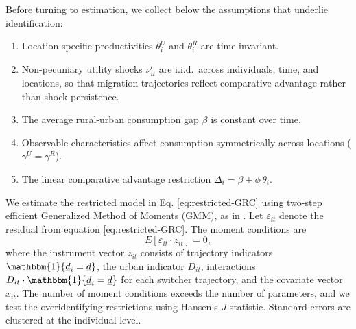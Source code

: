 \documentclass[12pt]{article}
\begin{document}
Before turning to estimation, we collect below the assumptions that underlie identification:
\begin{enumerate}[label=\textup{(A\arabic*)},leftmargin=*,itemsep=2pt]
    \item Location-specific productivities $\theta_i^U$ and $\theta_i^R$ are time-invariant.
    \item Non-pecuniary utility shocks $\nu_{it}^l$ are i.i.d.\ across individuals, time, and locations, so that migration trajectories reflect comparative advantage rather than shock persistence.
    \item The average rural-urban consumption gap $\beta$ is constant over time.
    \item Observable characteristics affect consumption symmetrically across locations ($\gamma^U = \gamma^R$).
    \item The linear comparative advantage restriction $\Delta_i = \beta + \phi\,\theta_i$.
\end{enumerate}

We estimate the restricted model in Eq. \eqref{eq:restricted-GRC} using two-step efficient Generalized Method of Moments (GMM), as in \cite{tjernstromCommentSuri2011}. 
Let $\varepsilon_{it}$ denote the residual from equation \eqref{eq:restricted-GRC}. The moment conditions are
\begin{equation}\label{eq:gmm-moments}
    E\!\left[\varepsilon_{it} \cdot z_{it}\right] = 0,
\end{equation}
where the instrument vector $z_{it}$ consists of trajectory indicators $\mathbbm{1}\{\underline{d}_i = \underline{d}\}$, the urban indicator $D_{it}$, interactions $D_{it} \cdot \mathbbm{1}\{\underline{d}_i = \underline{d}\}$ for each switcher trajectory, and the covariate vector $x_{it}$.
The number of moment conditions exceeds the number of parameters, and we test the overidentifying restrictions using Hansen's $J$-statistic.
Standard errors are clustered at the individual level.
\end{document}
